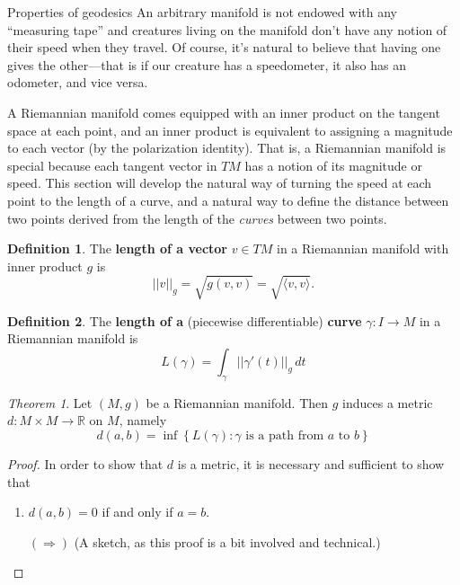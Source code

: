 \documentclass{article}
\newcommand{\fn}[3]{#1 \colon #2 \rightarrow #3}
\newcommand{\set}[1]{\left\{#1\right\}}
\theoremstyle{definition}
\newtheorem{definition}{Definition}[section]
\theoremstyle{remark}
\newtheorem{theorem}{Theorem}[section]
\begin{document}
\begin{section}{Properties of geodesics}
  An arbitrary manifold is not endowed with any ``measuring tape'' and creatures
  living on the manifold don't have any notion of their speed when they travel.
  Of course, it's natural to believe that having one gives the other---that is
  if our creature has a speedometer, it also has an odometer, and vice versa.

  A Riemannian manifold comes equipped with an inner product on the tangent
  space at each point, and an inner product is equivalent to assigning a
  magnitude to each vector (by the polarization identity).
  That is, a Riemannian manifold is special because
  each tangent vector in $TM$ has a notion of its magnitude or speed.
  This section will develop the natural way of turning the speed at each point
  to the length of a curve, and a natural way to define the distance between two
  points derived from the length of the \textit{curves} between two points.


  \begin{definition}
    The \textbf{length of a vector} $v \in TM$ in a Riemannian manifold with
    inner product $g$ is \[
      ||v||_g = \sqrt{g(v, v)} = \sqrt{\langle v, v \rangle}.
    \]
  \end{definition}

  \begin{definition}
    The \textbf{length of a} (piecewise differentiable) \textbf{curve}
    $\fn \gamma I M$ in a Riemannian manifold is
    \[
      L(\gamma) = \int_\gamma ||\gamma'(t)||_g \, dt
    \]
  \end{definition}

  \begin{theorem}
    Let $(M, g)$ be a Riemannian manifold. Then $g$ induces a metric $\fn d {M \times M} {\mathbb R}$ on $M$,
    namely \[
      d(a, b) = \inf \set{L(\gamma) : \gamma \text{ is a path from } a \text{ to } b}
    \]
  \end{theorem}
  \begin{proof}
    In order to show that $d$ is a metric, it is necessary and sufficient to
    show that  \begin{enumerate}
      \item $d(a, b) = 0$  if and only if $a = b$.

      $(\Longrightarrow)$ (A sketch, as this proof is a bit involved and technical.)


\end{enumerate}
\end{proof}
\end{section}
\end{document}
